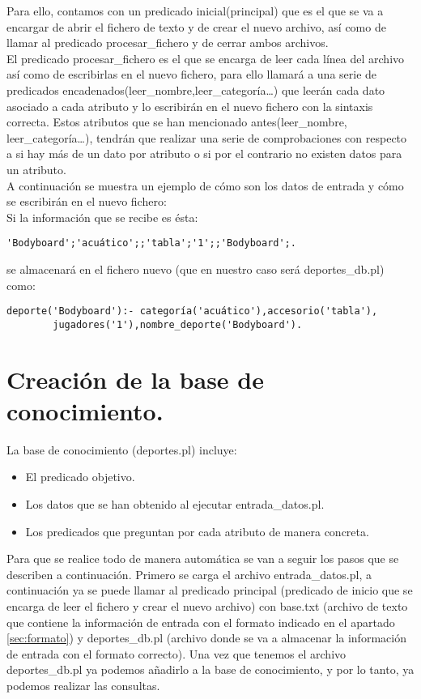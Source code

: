Para ello, contamos con un predicado inicial(principal) que es el que se va a encargar de abrir el fichero de texto y de crear el nuevo archivo, así como de llamar al predicado procesar\_fichero y de cerrar ambos archivos.\\

El predicado procesar\_fichero es el que se encarga de leer cada línea del archivo así como de escribirlas en el nuevo fichero, para ello llamará a una serie de predicados encadenados(leer\_nombre,leer\_categoría\ldots) que leerán cada dato asociado a cada atributo y lo escribirán en el nuevo fichero con la sintaxis correcta. Estos atributos que se han mencionado antes(leer\_nombre, leer\_categoría\ldots), tendrán que realizar una serie de comprobaciones con respecto a si hay más de un dato por atributo o si por el contrario no existen datos para un atributo.\\

A continuación se muestra un ejemplo de cómo son los datos de entrada y cómo se escribirán en el nuevo fichero:\\

Si la información que se recibe es ésta:
\begin{verbatim}
'Bodyboard';'acuático';;'tabla';'1';;'Bodyboard';.
\end{verbatim}

se almacenará en el fichero nuevo (que en nuestro caso será deportes\_db.pl) como:
\begin{verbatim}
deporte('Bodyboard'):- categoría('acuático'),accesorio('tabla'),
		jugadores('1'),nombre_deporte('Bodyboard').
\end{verbatim}

\section{Creación de la base de conocimiento.}
La base de conocimiento (deportes.pl) incluye:
\begin{itemize}
 \item El predicado objetivo.
 \item Los datos que se han obtenido al ejecutar entrada\_datos.pl.
 \item Los predicados que preguntan por cada atributo de manera concreta.
\end{itemize}

Para que se realice todo de manera automática se van a seguir los pasos que se describen a continuación. Primero se carga el archivo entrada\_datos.pl, a continuación ya se puede llamar al predicado principal (predicado de inicio que se encarga de leer el fichero y crear el nuevo archivo) con base.txt (archivo de texto que contiene la información de entrada con el formato indicado en el apartado \ref{sec:formato}) y deportes\_db.pl (archivo donde se va a almacenar la información de entrada con el formato correcto). Una vez que tenemos el archivo deportes\_db.pl ya podemos añadirlo a la base de conocimiento, y por lo tanto, ya podemos realizar las consultas.

